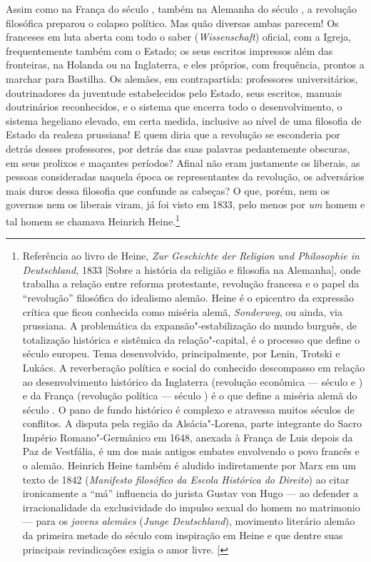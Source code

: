 Assim como na França do século , também na Alemanha do século ,
a revolução filosófica preparou o colapso político. Mas quão diversas
ambas parecem! Os franceses em luta aberta com todo o saber
(\emph{Wissenschaft}) oficial, com a Igreja, frequentemente também com o
Estado; os seus escritos impressos além das fronteiras, na Holanda ou na
Inglaterra, e eles próprios, com frequência, prontos a marchar para
Bastilha. Os alemães, em contrapartida: professores universitários,
doutrinadores da juventude estabelecidos pelo Estado, seus escritos,
manuais doutrinários reconhecidos, e o sistema que encerra todo o
desenvolvimento, o sistema hegeliano elevado, em certa medida, inclusive
ao nível de uma filosofia de Estado da realeza prussiana! E quem diria
que a revolução se esconderia por detrás desses professores, por detrás
das suas palavras pedantemente obscuras, em seus prolixos e maçantes
períodos? Afinal não eram justamente os liberais, as pessoas
consideradas naquela época os representantes da revolução, os
adversários mais duros dessa filosofia que confunde as cabeças? O que,
porém, nem os governos nem os liberais viram, já foi visto em 1833, pelo
menos por \emph{um} homem e tal homem se
chamava Heinrich
Heine.\footnote{Referência ao livro de Heine, \emph{Zur
  Geschichte der Religion und Philosophie in Deutschland,} 1833 {[}Sobre
  a história da religião e filosofia na Alemanha{]}, onde trabalha a
  relação entre reforma protestante, revolução francesa e o papel da
  ``revolução'' filosófica do idealismo alemão. Heine é o epicentro da
  expressão crítica que ficou conhecida como miséria alemã,
  \emph{Sonderweg}, ou ainda, via prussiana. A problemática da
  expansão"-estabilização do mundo burguês, de totalização histórica e
  sistêmica da relação"-capital, é o processo que define o século 
  europeu. Tema desenvolvido, principalmente, por Lenin, Trotski e
  Lukács. A reverberação política e social do conhecido descompasso em
  relação ao desenvolvimento histórico da Inglaterra (revolução
  econômica --- século  e ) e da França (revolução política ---
  século ) é o que define a miséria alemã do século . O pano de
  fundo histórico é complexo e atravessa muitos séculos de conflitos. A
  disputa pela região da Alsácia"-Lorena, parte integrante do Sacro
  Império Romano"-Germânico em 1648, anexada à França de Luis  depois
  da Paz de Vestfália, é um dos mais antigos embates envolvendo o povo
  francês e o alemão. Heinrich Heine também é aludido indiretamente por
  Marx em um texto de 1842 (\emph{Manifesto filosófico da Escola
  Histórica do Direito}) ao citar ironicamente a ``má'' influencia do
  jurista Gustav von Hugo --- ao defender a irracionalidade da
  exclusividade do impulso sexual do homem no matrimonio --- para os
  \emph{jovens alemães} (\emph{Junge Deutschland}), movimento literário
  alemão da primeira metade do século  com inspiração em Heine e que
  dentre suas principais revindicações exigia o amor livre. {[}\versal{N.\,T.}{]}}


